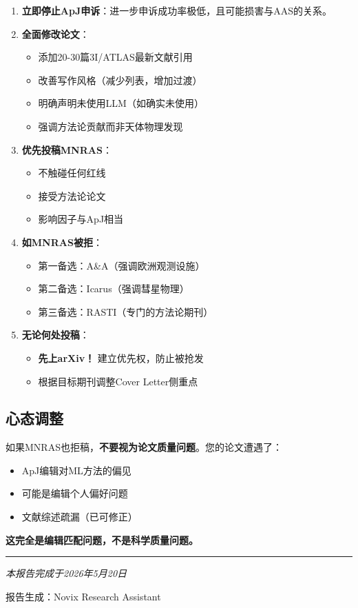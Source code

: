 \documentclass[12pt,a4paper]{article}
\begin{document}
\begin{enumerate}
    \item \textbf{立即停止ApJ申诉}：进一步申诉成功率极低，且可能损害与AAS的关系。

    \item \textbf{全面修改论文}：
    \begin{itemize}
        \item 添加20-30篇3I/ATLAS最新文献引用
        \item 改善写作风格（减少列表，增加过渡）
        \item 明确声明未使用LLM（如确实未使用）
        \item 强调方法论贡献而非天体物理发现
    \end{itemize}

    \item \textbf{优先投稿MNRAS}：
    \begin{itemize}
        \item 不触碰任何红线
        \item 接受方法论论文
        \item 影响因子与ApJ相当
    \end{itemize}

    \item \textbf{如MNRAS被拒}：
    \begin{itemize}
        \item 第一备选：A\&A（强调欧洲观测设施）
        \item 第二备选：Icarus（强调彗星物理）
        \item 第三备选：RASTI（专门的方法论期刊）
    \end{itemize}

    \item \textbf{无论何处投稿}：
    \begin{itemize}
        \item \textbf{先上arXiv！} 建立优先权，防止被抢发
        \item 根据目标期刊调整Cover Letter侧重点
    \end{itemize}
\end{enumerate}

\subsection{心态调整}

如果MNRAS也拒稿，\textbf{不要视为论文质量问题}。您的论文遭遇了：
\begin{itemize}
    \item ApJ编辑对ML方法的偏见
    \item 可能是编辑个人偏好问题
    \item 文献综述疏漏（已可修正）
\end{itemize}

\textbf{这完全是编辑匹配问题，不是科学质量问题。}

\vspace{1cm}
\begin{center}
\rule{0.8\textwidth}{0.4pt}

{\large\itshape 本报告完成于2026年5月20日}

{\small 报告生成：Novix Research Assistant}
\end{center}
\end{document}

